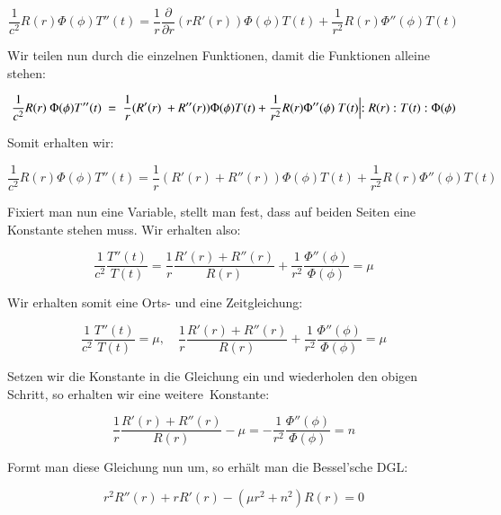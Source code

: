 \begin{equation}
\frac{1}{c^2} R(r) \Phi(\phi) T''(t) = \frac{1}{r} \frac{\partial}{\partial r}(r R'(r)) \Phi(\phi) T(t) + \frac{1}{r^2} R(r) \Phi''(\phi) T(t)
\end{equation}

Wir teilen nun durch die einzelnen Funktionen, damit die Funktionen alleine stehen:

\begin{equation}
\frac{1}{c^2} R(r) \Phi(\phi) T''(t) = \frac{1}{r}(R'(r) + R''(r)) \Phi(\phi) T(t) + \frac{1}{r^2} R(r) \Phi''(\phi) T(t)
\Bigl\lvert
:R(r) : T(t) :\Phi(\phi)
\end{equation}

Somit erhalten wir:

\begin{equation}
\frac{1}{c^2} R(r) \Phi(\phi) T''(t) = \frac{1}{r} (R'(r) + R''(r)) \Phi(\phi) T(t) + \frac{1}{r^2} R(r) \Phi''(\phi) T(t)
\end{equation}

Fixiert man nun eine Variable, stellt man fest, dass auf beiden Seiten eine Konstante stehen muss. Wir erhalten also:

\begin{equation}
\frac{1}{c^2}
\frac{T''(t)}{T(t)} = 
\frac{1}{r} 
\frac{R'(r) + R''(r)}{R(r)} + 
\frac{1}{r^2}
\frac{\Phi''(\phi)}{\Phi(\phi)} = \mu
\end{equation}

Wir erhalten somit eine Orts- und eine Zeitgleichung:

\begin{equation}
\frac{1}{c^2} 
\frac{T''(t)}{T(t)} = 
\mu
,\quad
\frac{1}{r} \frac{R'(r) + R''(r)}{R(r)} + 
\frac{1}{r^2} \frac{\Phi''(\phi)}{\Phi(\phi)} = 
\mu
\end{equation}

Setzen wir die Konstante in die Gleichung ein und wiederholen den obigen Schritt, so erhalten wir eine weitere Konstante:

\begin{equation}
\frac{1}{r} \frac{R'(r) + R''(r)}{R(r)} - \mu =
-\frac{1}{r^2} \frac{\Phi''(\phi)}{\Phi(\phi)} = n
\end{equation}

Formt man diese Gleichung nun um, so erhält man die Bessel'sche DGL:

\begin{equation}
r^2 R''(r) + r R'(r) - (\mu r^2 + n^2)R(r) = 0
\label{eq:besselsche_dgl }
\end{equation}
